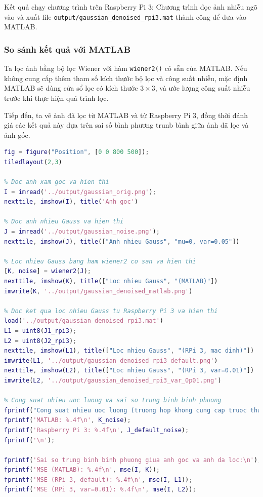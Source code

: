 Kết quả chạy chương trình trên Raspberry Pi 3: 
Chương trình đọc ảnh nhiễu ngõ vào và xuất file \verb|output/gaussian_denoised_rpi3.mat| thành công để đưa vào MATLAB.

\subsubsection{So sánh kết quả với MATLAB}

Ta lọc ảnh bằng bộ lọc Wiener với hàm \texttt{wiener2()} có sẵn của MATLAB. 
Nếu không cung cấp thêm tham số kích thước bộ lọc và công suất nhiễu,
mặc định MATLAB sẽ dùng cửa sổ lọc có kích thước $3 \times 3$, 
và ước lượng công suất nhiễu trước khi thực hiện quá trình lọc.

Tiếp đến, ta vẽ ảnh đã lọc từ MATLAB và từ Raspberry Pi 3, 
đồng thời đánh giá các kết quả này dựa trên sai số bình phương trunb bình giữa ảnh đã lọc và ảnh gốc.

\begin{lstlisting}[language=MATLAB]
fig = figure("Position", [0 0 800 500]);
tiledlayout(2,3)

% Doc anh xam goc va hien thi
I = imread('../output/gaussian_orig.png');
nexttile, imshow(I), title('Anh goc')

% Doc anh nhieu Gauss va hien thi
J = imread('../output/gaussian_noise.png');
nexttile, imshow(J), title(["Anh nhieu Gauss", "mu=0, var=0.05"])

% Loc nhieu Gauss bang ham wiener2 co san va hien thi
[K, noise] = wiener2(J);
nexttile, imshow(K), title(["Loc nhieu Gauss", "(MATLAB)"])
imwrite(K, '../output/gaussian_denoised_matlab.png')

% Doc ket qua loc nhieu Gauss tu Raspberry Pi 3 va hien thi
load('../output/gaussian_denoised_rpi3.mat')
L1 = uint8(J1_rpi3);
L2 = uint8(J2_rpi3);
nexttile, imshow(L1), title(["Loc nhieu Gauss", "(RPi 3, mac dinh)"])
imwrite(L1, '../output/gaussian_denoised_rpi3_default.png')
nexttile, imshow(L2), title(["Loc nhieu Gauss", "(RPi 3, var=0.01)"])
imwrite(L2, '../output/gaussian_denoised_rpi3_var_0p01.png')

% Cong suat nhieu uoc luong va sai so trung binh binh phuong
fprintf("Cong suat nhieu uoc luong (truong hop khong cung cap truoc tham so nhieu):\n");
fprintf('MATLAB: %.4f\n', K_noise);
fprintf('Raspberry Pi 3: %.4f\n', J_default_noise);
fprintf('\n');

fprintf('Sai so trung binh binh phuong giua anh goc va anh da loc:\n');
fprintf('MSE (MATLAB): %.4f\n', mse(I, K));
fprintf('MSE (RPi 3, default): %.4f\n', mse(I, L1));
fprintf('MSE (RPi 3, var=0.01): %.4f\n', mse(I, L2));
\end{lstlisting}

